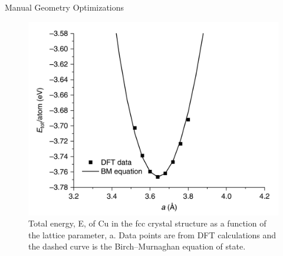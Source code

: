 \documentclass[aspectratio=169]{beamer}
\begin{document}
    \begin{frame}{Manual Geometry Optimizations}
        \begin{figure}
            \centering
            \includegraphics[width=0.45\linewidth]{lectures/figures/8_Cu_EOS.png}
            \caption{Total energy, E, of Cu in the fcc crystal structure as a function of the lattice parameter, a. Data points are from DFT calculations and the dashed curve is the Birch–Murnaghan equation of state.\cite{shollDensityFunctionalTheory2009}}
        \end{figure}
    \end{frame}
\end{document}
